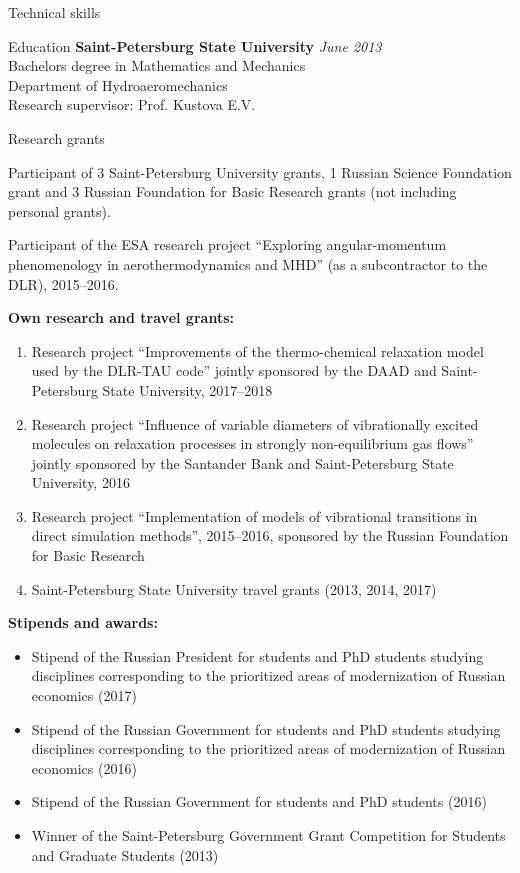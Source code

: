 \documentclass{resume} %
\begin{document}
\begin{rSection}{Technical skills}
\begin{rSection}{Education}
{\bf Saint-Petersburg State University} \hfill {\em June 2013} \\ 
Bachelors degree in Mathematics and Mechanics \\
Department of Hydroaeromechanics \smallskip \\
Research supervisor: Prof. Kustova E.V. \\

\end{rSection}


\begin{rSection}{Research grants}

Participant of 3 Saint-Petersburg University grants, 1 Russian Science Foundation grant and 3 Russian Foundation for Basic Research grants (not including personal grants).

Participant of the ESA research project ``Exploring angular-momentum phenomenology in aerothermodynamics and MHD'' (as a subcontractor to the DLR), 2015--2016.

{\bf Own research and travel grants:}

\begin{enumerate}

    \item Research project ``Improvements of the thermo-chemical relaxation model used by the DLR-TAU code'' jointly sponsored by the DAAD and Saint-Petersburg State University, 2017--2018
    \item Research project ``Influence of variable diameters of vibrationally excited molecules on relaxation processes in strongly non-equilibrium gas flows'' jointly sponsored by the Santander Bank and Saint-Petersburg State University, 2016
    \item Research project ``Implementation of models of vibrational transitions in direct simulation methods'', 2015--2016, sponsored by the Russian Foundation for Basic Research
    \item Saint-Petersburg State University travel grants (2013, 2014, 2017)

\end{enumerate}

{\bf Stipends and awards:}
\begin{itemize}
    \item Stipend of the Russian President for students and PhD students studying disciplines corresponding to the prioritized areas of modernization of Russian economics (2017)
    \item Stipend of the Russian Government for students and PhD students studying disciplines corresponding to the prioritized areas of modernization of Russian economics (2016)
    \item Stipend of the Russian Government for students and PhD students (2016)
    \item Winner of the Saint-Petersburg Government Grant Competition for Students and Graduate Students (2013)
\end{itemize}
\end{rSection}



\end{rSection}
\end{document}
